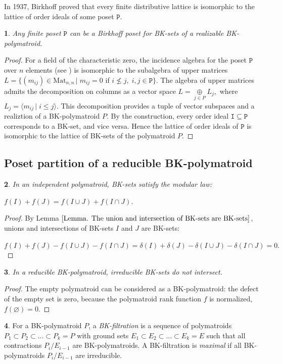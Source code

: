 \documentclass[11pt]{article}
\theoremstyle{plain}
\newtheorem{thm}{\protect\theoremname}[section]
\theoremstyle{definition}
\newtheorem{defn}[thm]{\protect\definitionname}
\theoremstyle{remark}
\theoremstyle{plain}
\newtheorem{lem}[thm]{\protect\lemmaname}
\theoremstyle{plain}
\newtheorem{prop}[thm]{\protect\propositionname}
\theoremstyle{plain}
\theoremstyle{definition}
\providecommand{\definitionname}{Definition}
\providecommand{\lemmaname}{Lemma}
\providecommand{\propositionname}{Proposition}
\providecommand{\theoremname}{Theorem}
\begin{document}
In 1937, Birkhoff proved \cite{birkhoff_rings_1937} that every finite
distributive lattice is isomorphic to the lattice of order ideals
of some poset $\mathtt{P}.$
\begin{thm}
\label{Theorem. The poset can be arbitratry}Any finite poset $\mathtt{P}$
can be a Birkhoff poset for BK-sets of a realizable BK-polymatroid.
\end{thm}

\begin{proof}
For a field of the characteristic zero, the incidence algebra for
the poset $\mathtt{P}$ over $n$ elements (see \cite{stanley_enumerative_2011})
is isomorphic to the subalgebra of upper matrices $L=\{(m_{ij})\in\mathrm{Mat}_{n,n}\,|\;m_{ij}=0$
if $i\nleq j,\;i,j\in\mathtt{P}\}.$ The algebra of upper matrices
admits the decomposition on columns as a vector space $L=\underset{j\in P}{\oplus}L_{j},$
where $L_{j}=\langle m_{ij}\,|\;i\leq j\rangle.$ This decomposition
provides a tuple of vector subspaces and a realiztion of a BK-polymatroid
$P$. By the construction, every order ideal $\mathtt{I}\subseteq\mathtt{P}$
corresponds to a BK-set, and vice versa. Hence the lattice of order
ideals of $\mathtt{P}$ is isomorphic to the lattice of BK-sets of
the polymatroid $P$.
\end{proof}

\subsection{Poset partition of a reducible BK-polymatroid}
\begin{prop}
In an independent polymatroid, BK-sets satisfy the modular law:

$f(I)+f(J)=f(I\cup J)+f(I\cap J)$.
\end{prop}

\begin{proof}
By Lemma $\ref{Lemma. The union and intersection of BK-sets are BK-sets}$,
unions and intersections of BK-sets $I$ and $J$ are BK-sets:

$f(I)+f(J)-f(I\cup J)-f(I\cap J)=\delta(I)+\delta(J)-\delta(I\cup J)-\delta(I\cap J)=0.$
\end{proof}
\begin{lem}
\label{Lemma. Irreducible BK-sets don't intersect}In a reducible
BK-polymatroid, irreducible BK-sets do not intersect.
\end{lem}

\begin{proof}
The empty polymatroid can be considered as a BK-polymatroid: the defect
of the empty set is zero, because the polymatroid rank function $f$
is normalized, $f(\varnothing)=0$.
\end{proof}
\begin{defn}
For a BK-polymatroid $P$, a \textit{BK-filtration} is a sequence
of polymatroids $P_{1}\subset P_{2}\subset...\subset P_{k}=P$ with
ground sets $E_{1}\subset E_{2}\subset...\subset E_{k}=E$ such that
all contractions $P_{i}/E_{i-1}$ are BK-polymatroids. A BK-filtration
is \textit{maximal} if all BK-polymatroids $P_{i}/E_{i-1}$ are irreducible.
\end{defn}
\end{document}
